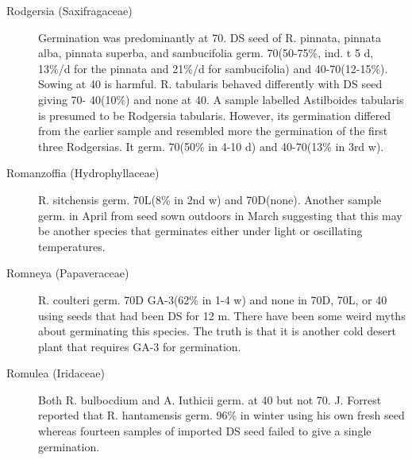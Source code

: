 \begin{description}
\item[Rodgersia (Saxifragaceae)] Germination was predominantly at 70. DS
seed of R. pinnata, pinnata alba, pinnata superba, and sambucifolia germ. 70(50-75\%,
ind. t 5 d, 13\%/d for the pinnata and 21\%/d for sambucifolia) and 40-70(12-15\%).
Sowing at 40 is harmful. R. tabularis behaved differently with DS seed giving 70-
40(10\%) and none at 40. A sample labelled Astilboides tabularis is presumed to be
Rodgersia tabularis. However, its germination differed from the earlier sample and
resembled more the germination of the first three Rodgersias. It germ. 70(50\% in 4-10
d) and 40-70(13\% in 3rd w).

\item[Romanzoffia (Hydrophyllaceae)] R. sitchensis germ. 70L(8\% in 2nd w)
and 70D(none). Another sample germ. in April from seed sown outdoors in March
suggesting that this may be another species that germinates either under light or
oscillating temperatures.

\item[Romneya (Papaveraceae)] R. coulteri germ. 70D GA-3(62\% in 1-4 w) and
none in 70D, 70L, or 40 using seeds that had been DS for 12 m. There have been
some weird myths about germinating this species. The truth is that it is another cold
desert plant that requires GA-3 for germination.
\item[Romulea (Iridaceae)] Both R. bulbocdium and A. Iuthicii germ. at 40 but not
70. J. Forrest reported that R. hantamensis germ. 96\% in winter using his own fresh
seed whereas fourteen samples of imported DS seed failed to give a single
germination.


\end{description}
